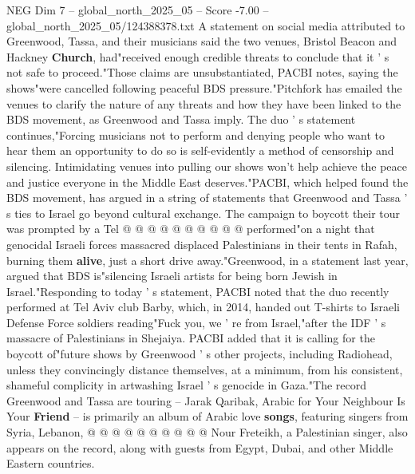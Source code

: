 \begin{textsample}{NEG Dim 7 – global\_north\_2025\_05 – Score -7.00 – global\_north\_2025\_05/124388378.txt}  \label{ex:f7_neg_110}
A statement on social media attributed to Greenwood, Tassa, and their musicians said the two venues, Bristol Beacon and Hackney \textbf{Church}, had"received enough credible threats to conclude that it ' s not safe to proceed."Those claims are unsubstantiated, PACBI notes, saying the shows"were cancelled following peaceful BDS pressure."Pitchfork has emailed the venues to clarify the nature of any threats and how they have been linked to the BDS movement, as Greenwood and Tassa imply.
The duo ' s statement continues,"Forcing musicians not to perform and denying people who want to hear them an opportunity to do so is self-evidently a method of censorship and silencing.
Intimidating venues into pulling our shows won't help achieve the peace and justice everyone in the Middle East deserves."PACBI, which helped found the BDS movement, has argued in a string of statements that Greenwood and Tassa ' s ties to Israel go beyond cultural exchange.
The campaign to boycott their tour was prompted by a Tel @ @ @ @ @ @ @ @ @ @ performed"on a night that genocidal Israeli forces massacred displaced Palestinians in their tents in Rafah, burning them \textbf{alive}, just a short drive away."Greenwood, in a statement last year, argued that BDS is"silencing Israeli artists for being born Jewish in Israel."Responding to today ' s statement, PACBI noted that the duo recently performed at Tel Aviv club Barby, which, in 2014, handed out T-shirts to Israeli Defense Force soldiers reading"Fuck you, we ' re from Israel,"after the IDF ' s massacre of Palestinians in Shejaiya.
PACBI added that it is calling for the boycott of"future shows by Greenwood ' s other projects, including Radiohead, unless they convincingly distance themselves, at a minimum, from his consistent, shameful complicity in artwashing Israel ' s genocide in Gaza."The record Greenwood and Tassa are touring -- Jarak Qaribak, Arabic for Your Neighbour Is Your \textbf{Friend} -- is primarily an album of Arabic love \textbf{songs}, featuring singers from Syria, Lebanon, @ @ @ @ @ @ @ @ @ @ Nour Freteikh, a Palestinian singer, also appears on the record, along with guests from Egypt, Dubai, and other Middle Eastern countries.

\end{textsample}
